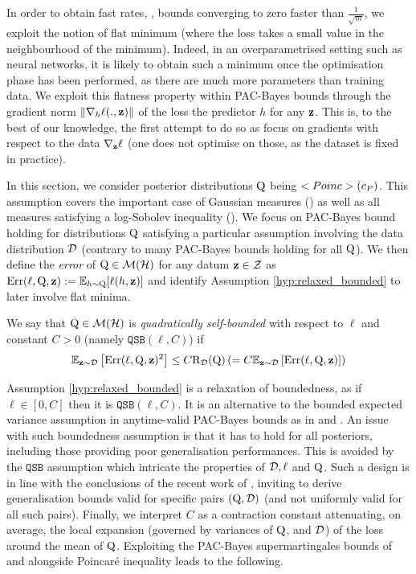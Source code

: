 In order to obtain fast rates, \ie, bounds converging to zero faster than $\frac{1}{\sqrt{m}}$,  we exploit the notion of flat minimum (where the loss takes a small value in the neighbourhood of the minimum).
Indeed, in an overparametrised setting such as neural networks, it is likely to obtain such a minimum once the optimisation phase has been performed, as there are much more parameters than training data.
We exploit this flatness property within PAC-Bayes bounds through the gradient norm $\| \nabla_h \ell(.,\mathbf{z})\|$ of the loss \wrt the predictor $h$ for any $\mathbf{z}$.
This is, to the best of our knowledge, the first attempt to do so as \citet{gat2022grad} focus on gradients with respect to the data $\nabla_{\mathbf{z}}\ell$ (one does not optimise on those, as the dataset is fixed in practice).
  
In this section, we consider posterior distributions $\mathrm{Q}$ being $<Poinc>(c_P)$.
This assumption covers the important case of Gaussian measures () as well as all measures satisfying a log-Sobolev inequality ().
We focus on PAC-Bayes bound holding for distributions $\mathrm{Q}$ satisfying a particular assumption involving the data distribution $\mathcal{D}$ (contrary to many PAC-Bayes bounds holding for all $\mathrm{Q}$).
We then define the \emph{error} of $\mathrm{Q}\in \mathcal{M}(\mathcal{H})$ for any datum $\mathbf{z}\in\mathcal{Z}$ as $\operatorname*{\mathrm{Err}}(\ell,\mathrm{Q},\mathbf{z}):= \mathbb{E}_{h\sim\mathrm{Q}}[\ell(h,\mathbf{z})]$ and identify Assumption \ref{hyp:relaxed_bounded} to later involve flat minima.

  
  \begin{assumption}
    \label{hyp:relaxed_bounded}
    We say that $\mathrm{Q}\in\mathcal{M}(\mathcal{H})$ is \emph{quadratically self-bounded} with respect to $\ell$ and constant $C>0$ (namely $\texttt{QSB}(\ell,C)$) if
    \[ \mathbb{E}_{\mathbf{z}\sim \mathcal{D}}\left[ \operatorname*{\mathrm{Err}}(\ell,\mathrm{Q},\mathbf{z})^2 \right] \leq C \text{R}_{\mathcal{D}}(\mathrm{Q}) \left( = C\mathbb{E}_{\mathbf{z}\sim \mathcal{D}}\left[ \operatorname*{\mathrm{Err}}(\ell,\mathrm{Q},\mathbf{z}) \right] \right)   \]
  \end{assumption}
Assumption \ref{hyp:relaxed_bounded} is a relaxation of boundedness, as if $\ell\in[0,C]$ then it is $\texttt{QSB}(\ell,C)$.
It is an alternative to the bounded expected variance assumption in anytime-valid PAC-Bayes bounds as in  and \citep{chugg2023unified}.
An issue with such boundedness assumption is that it has to hold for all posteriors, including those providing poor generalisation performances.
This is avoided by the $\texttt{QSB}$ assumption which intricate the properties of $\mathcal{D},\ell$ and $\mathrm{Q}$.
Such a design is in line with the conclusions of the recent work of \citet{gastpar2023fantastic}, inviting to derive generalisation bounds valid for specific pairs $(\mathrm{Q},\mathcal{D})$ (and not uniformly valid for all such pairs).
Finally, we interpret $C$ as a contraction constant attenuating, on average, the local expansion (governed by variances of $\mathrm{Q}$, and $\mathcal{D}$) of the loss around the mean of $\mathrm{Q}$.
Exploiting the PAC-Bayes supermartingales bounds of  and \citet{chugg2023unified} alongside Poincaré inequality leads to the following. 

